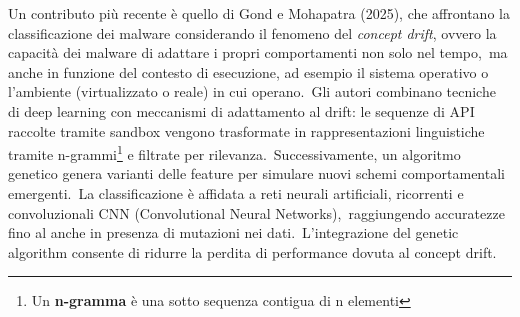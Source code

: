 Un contributo più recente è quello di Gond e Mohapatra (2025), che affrontano la classificazione dei
malware considerando il fenomeno del \textit{concept drift}, ovvero la capacità dei malware di adattare i propri comportamenti non solo nel tempo,\
ma anche in funzione del contesto di esecuzione, ad esempio il sistema operativo o l'ambiente (virtualizzato o reale) in cui operano.\
Gli autori combinano tecniche di deep learning con meccanismi di adattamento al drift:
le sequenze di API raccolte tramite sandbox vengono trasformate in rappresentazioni linguistiche
tramite n-grammi\footnote{Un \textbf{n-gramma} è una sotto sequenza contigua di n elementi} e filtrate per rilevanza.\
Successivamente, un algoritmo genetico genera varianti delle feature per simulare nuovi schemi comportamentali emergenti.\
La classificazione è affidata a reti neurali artificiali, ricorrenti e convoluzionali CNN (Convolutional Neural Networks),\
raggiungendo accuratezze fino al  anche in presenza di mutazioni nei dati.\
L'integrazione del genetic algorithm consente di ridurre la perdita di performance dovuta al concept drift.

